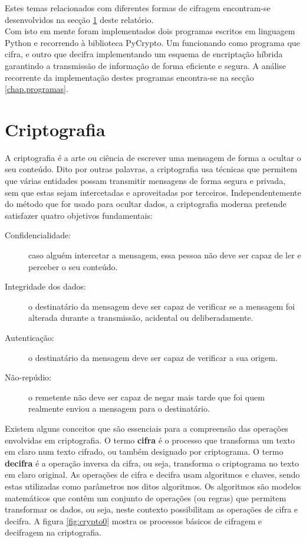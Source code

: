 \documentclass[a4paper,11pt,openright,oneside]{report}
\begin{document}
Estes temas relacionados com diferentes formas de cifragem encontram-se desenvolvidos na secção \ref{chap.criptografia} deste relatório.\\

Com isto em mente foram implementados dois programas escritos em linguagem Python e recorrendo à biblioteca PyCrypto. Um funcionando como programa que cifra, e outro que decifra implementando um esquema de encriptação híbrida garantindo a transmissão de informação de forma eficiente e segura. A análise recorrente da implementação destes programas encontra-se na secção \ref{chap.programas}.

\chapter{Criptografia}
\label{chap.criptografia}

A criptografia é a arte ou ciência de escrever uma mensagem de forma a ocultar o seu conteúdo. Dito por outras palavras, a criptografia usa técnicas que permitem que várias entidades possam transmitir mensagens de forma segura e privada, sem que estas sejam intercetadas e aproveitadas por terceiros. Independentemente do método que for usado para ocultar dados, a criptografia moderna pretende satisfazer quatro objetivos fundamentais:

\begin{description}
\item[Confidencialidade:] caso alguém intercetar a mensagem, essa pessoa não deve ser capaz de ler e perceber o seu conteúdo.
\item[Integridade dos dados:] o destinatário da mensagem deve ser capaz de verificar se a mensagem foi alterada durante a transmissão, acidental ou deliberadamente.
\item[Autenticação:] o destinatário da mensagem deve ser capaz de verificar a sua origem.
\item[Não-repúdio:] o remetente não deve ser capaz de negar mais tarde que foi quem realmente enviou a mensagem para o destinatário.
\end{description}

Existem alguns conceitos que são essenciais para a compreensão das operações envolvidas em criptografia. O termo \textbf{cifra} é o processo que transforma um texto em claro num texto cifrado, ou também designado por criptograma. O termo \textbf{decifra} é a operação inversa da cifra, ou seja, transforma o criptograma no texto em claro original. As operações de cifra e decifra usam algoritmos e chaves, sendo estas utilizadas como parâmetros nos ditos algoritmos. Os algoritmos são modelos matemáticos que contêm um conjunto de operações (ou regras) que permitem transformar os dados, ou seja, neste contexto possibilitam as operações de cifra e decifra. A figura \ref{fig:crypto0} mostra os processos básicos de cifragem e decifragem na criptografia.
\end{document}
